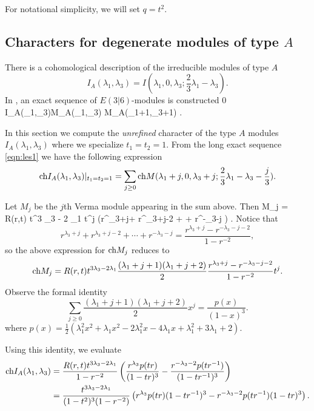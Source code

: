 For notational simplicity, we will set $q = t^2$.

\subsection{Characters for degenerate modules of type $A$} \label{s:typeA}

There is a cohomological description of the irreducible modules of type $A$
\[
I_A(\lambda_1,\lambda_3) = I(\lambda_1,0,\lambda_3;\frac23 \lambda_1 - \lambda_3) .
\]
In \cite{KR2}, an exact sequence of $E(3|6)$-modules is constructed
\beqn\label{eqn:les1}
0 \leftarrow I_A(\lambda_1,\lambda_3)\leftarrow M_A(\lambda_1,\lambda_3) \leftarrow M_A(\lambda_1+1,\lambda_3+1) \leftarrow \cdots .
\eeqn

\parsec[s:typeAunrefinedKR]
In this section we compute the {\em unrefined} character of the type $A$ modules $I_A(\lambda_1,\lambda_3)$ where we specialize $t_1=t_2=1$.
From the long exact sequence \eqref{eqn:les1} we have the following expression 
\[
{\rm ch} I_A(\lambda_1,\lambda_3)|_{t_1=t_2=1} = \sum_{j \geq 0} {\rm ch} M(\lambda_1+j,0,\lambda_3+j;\frac23 \lambda_1 - \lambda_3 - \frac{j}{3}) .
\]

Let $M_j$ be the $j$th Verma module appearing in the sum above. 
Then
\beqn
\ch M_j = R(r,t) t^{3 \lambda_3 - 2 \lambda_1}  t^j \left(r^{\lambda_3+j}+ r^{\lambda_3+j-2} + \cdots + r^{-\lambda_3-j} \right) .
\eeqn
Notice that 
\[
r^{\lambda_3+j}+ r^{\lambda_3+j-2} + \cdots + r^{-\lambda_3-j} = \frac{r^{\lambda_3+j}-r^{-\lambda_3-j-2}}{1-r^{-2}} ,
\]
so the above expression for ${\rm ch} M_j$ reduces to
\[
{\rm ch} M_j = R(r,t) t^{3 \lambda_3 - 2 \lambda_1} \frac{(\lambda_1+j+1)(\lambda_1+j+2)}{2} \frac{r^{\lambda_3+j}-r^{-\lambda_3-j-2}}{1-r^{-2}} t^j .
\]
Observe the formal identity 
\[
\sum_{j \geq 0} \frac{(\lambda_1+j+1)(\lambda_1+j+2)}{2} x^j = \frac{p(x)}{(1-x)^3}  .
\]
where $p(x) = \frac12 \left(\lambda_1^2 x^2 + \lambda_1 x^2 - 2\lambda_1^2x -4 \lambda_1 x + \lambda_1^2 + 3\lambda_1 +2\right)$. 

Using this identity, we evaluate
\begin{align*}
{\rm ch} I_A(\lambda_1,\lambda_3) & = \frac{R(r,t) t^{3 \lambda_3 - 2 \lambda_1}}{1-r^{-2}} \left(\frac{r^{\lambda_3} p(tr)}{(1-tr)^3} - \frac{r^{-\lambda_3-2}p(tr^{-1})}{(1-tr^{-1})^3} \right) \\ 
& = \frac{t^{3 \lambda_3-2\lambda_1}}{(1-t^2)^3(1-r^{-2})} \left(r^{\lambda_3} p(tr) (1-tr^{-1})^3 - r^{-\lambda_3-2} p(tr^{-1})(1-tr)^3 \right) .
\end{align*}

